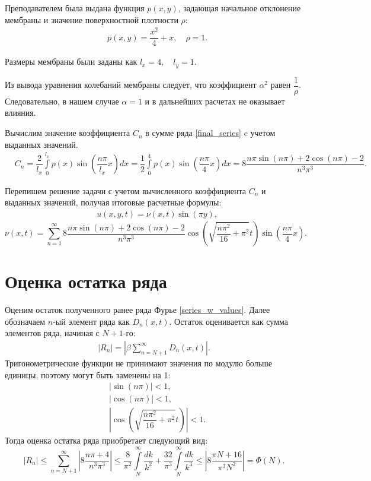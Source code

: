 {{Преподавателем была выдана функция $p(x,y)$, задающая начальное отклонение мембраны и значение поверхностной плотности $\rho$:
    \begin{align*}
        &p(x,y) = \dfrac{x^2}{4} + x, \quad \rho = 1. 
    \end{align*}
    
Размеры мембраны были заданы как $l_x=4, \quad l_y=1$.

Из вывода уравнения колебаний мембраны следует, что коэффициент $\alpha^2$ равен $\dfrac{1}{\rho}$. Следовательно, в нашем случае $\alpha=1$ и в дальнейших расчетах не оказывает влияния.

Вычислим значение коэффициента $C_n$ в сумме ряда \eqref{final_series} c учетом выданных значений.
	\begin{align*}
	&C_n = \dfrac{2}{l_x}\int\limits_{0}^{l_x}{p(x)\sin(\dfrac{n\pi}{l_x}x)dx} =  \dfrac{1}{2}\int\limits_{0}^{4}{p(x)\sin(\dfrac{n\pi}{4}x)dx} = 
	8\dfrac{n\pi\sin(n\pi) + 2\cos(n\pi) - 2}{n^3 \pi^3}.
	\end{align*}        
	
Перепишем решение задачи с учетом вычисленного коэффициента $C_n$ и выданных значений, получая итоговые расчетные формулы:
	\begin{align*}
  	&u(x,y,t) = \nu(x,t)\sin (\pi y),
   	\end{align*}
   	\begin{equation}\label{series_w_values}
   	\nu(x,t) = \sum_{n=1}^{\infty}{
   	8\dfrac{n\pi\sin(n\pi) + 2\cos(n\pi) - 2}{n^3 \pi^3}
   	\cos(\sqrt{\dfrac{n\pi^2}{16}+\pi^2}t)\sin(\dfrac{n\pi}{4}x)}.
	\end{equation}	 
} 

\newpage
\section{Оценка остатка ряда}
{
	Оценим остаток полученного ранее ряда Фурье \eqref{series_w_values}. Далее обозначаем $n$-ый элемент ряда как $D_n(x,t)$.
	Остаток оценивается как сумма элементов ряда, начиная с $N+1$-го:
	\begin{align*}
	|R_n| = \left|\beta\sum_{n=N+1}^{\infty}{D_n(x,t)}\right|.
	\end{align*}
	Тригонометрические функции не принимают значения по модулю больше единицы, поэтому могут быть заменены на 1:
	\begin{align*}
	&|\sin(n\pi)| < 1,\\
	&|\cos(n\pi)| < 1,\\
	&|\cos(\sqrt{\dfrac{n\pi^2}{16}+\pi^2}t)| < 1.
	\end{align*}
Тогда оценка остатка ряда приобретает следующий вид:
	\begin{equation}
	|R_n| \le \sum_{n=N+1}^{\infty}{\left|8\dfrac{n\pi+4}{n^3\pi^3}\right|} 
	\le 
	\dfrac{8}{\pi^2}\int\limits_{N}^{\infty}{\dfrac{dk}{k^2}} 
	+ \dfrac{32}{\pi^3}\int\limits_{N}^{\infty}{\dfrac{dk}{k^3}}
	\le 
	\left|8\dfrac{\pi N+16}{\pi^3 N^2 }\right| = \Phi(N).
	\end{equation}
	
}}
